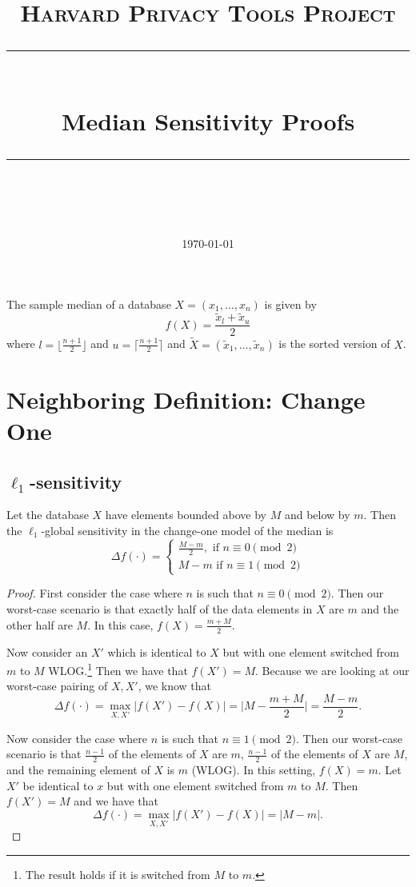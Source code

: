 \documentclass[11pt]{scrartcl} %
\title{
	\normalfont\normalsize
	\textsc{Harvard Privacy Tools Project}\\ %
	\vspace{25pt} %
	\rule{\linewidth}{0.5pt}\\ %
	\vspace{20pt} %
	{\huge Median Sensitivity Proofs}\\ %
	\vspace{12pt} %
	\rule{\linewidth}{2pt}\\ %
	\vspace{12pt} %
}
\date{\normalsize\today} %
\begin{document}
\maketitle

\begin{definition}
The sample median of a database $X = (x_1, \hdots, x_n)$ is given by
\[ f(X) = \frac{\tilde{x}_l + \tilde{x}_u}{2} \]
where $l = \lfloor \frac{n+1}{2} \rfloor$ and $u = \lceil \frac{n+1}{2} \rceil$ and
$\tilde{X} = (\tilde{x}_1, \hdots, \tilde{x}_n)$ is the sorted version of $X$.
\end{definition}

\section{Neighboring Definition: Change One}

\subsection{$\ell_1$-sensitivity}
\begin{theorem}
	Let the database $X$ have elements bounded above by $M$ and below by $m$.
	Then the $\ell_1$-global sensitivity in the change-one model of the median is
	\[
		\Delta f(\cdot) =
			\begin{cases}
				\frac{M - m}{2}, \text{ if } n \equiv 0 \pmod{2} \\
				M-m \text{ if } n \equiv 1 \pmod{2}
			\end{cases}
	\]
\end{theorem}

\begin{proof}
	First consider the case where $n$ is such that $n \equiv 0 \pmod{2}$. Then our worst-case scenario is that exactly
	half of the data elements in $X$ are $m$ and the other half are $M$. In this case,
	$f(X) = \frac{m + M}{2}$. \newline

	Now consider an $X'$ which is identical to $X$ but with one element switched from
	$m$ to $M$ WLOG.\footnote{The result holds if it is switched from $M$ to $m$.}
	Then we have that $f(X') = M$. Because we are looking at our worst-case pairing of $X,X'$,
	we know that
	\[ \Delta f(\cdot) = \max_{X,X'} |f(X') - f(X)| = \big\vert M - \frac{m+M}{2} \big\vert = \frac{M-m}{2}. \]

	Now consider the case where $n$ is such that $n \equiv 1 \pmod{2}$.
	Then our worst-case scenario is that $\frac{n-1}{2}$ of the elements of $X$ are $m$,
	$\frac{n-1}{2}$ of the elements of $X$ are $M$, and the remaining element of $X$ is $m$ (WLOG).
	In this setting, $f(X) = m$.
	Let $X'$ be identical to $x$ but with one element switched from $m$ to $M$.
	Then $f(X') = M$ and we have that
	\[ \Delta f(\cdot) = \max_{X,X'} |f(X') - f(X)| = |M - m|. \]
\end{proof}
\end{document}
